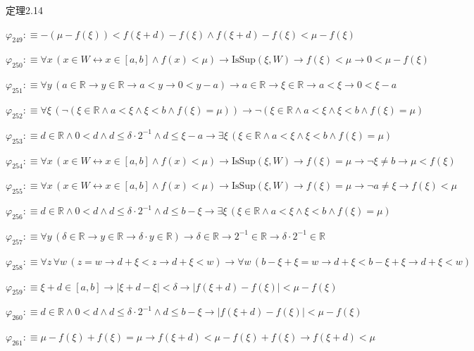 \begin{fullproof}{定理2.14}
\begin{abbrevlist}
\item $\varphi_{249} :\equiv -(\mu - f(\xi)) < f(\xi + d) - f(\xi) \land f(\xi + d) - f(\xi) < \mu - f(\xi)$
\item $\varphi_{250} :\equiv \forall x\,(x \in W \leftrightarrow x \in [a,b] \land f(x) < \mu) \to \mathrm{IsSup}(\xi,W) \to f(\xi) < \mu \to 0 < \mu - f(\xi)$
\item $\varphi_{251} :\equiv \forall y\,(a \in \mathbb{R} \to y \in \mathbb{R} \to a < y \to 0 < y - a) \to a \in \mathbb{R} \to \xi \in \mathbb{R} \to a < \xi \to 0 < \xi - a$
\item $\varphi_{252} :\equiv \forall \xi\,(\neg (\xi \in \mathbb{R} \land a < \xi \land \xi < b \land f(\xi) = \mu)) \to \neg (\xi \in \mathbb{R} \land a < \xi \land \xi < b \land f(\xi) = \mu)$
\item $\varphi_{253} :\equiv d \in \mathbb{R} \land 0 < d \land d \leq \delta \cdot 2^{-1} \land d \leq \xi - a \to \exists \xi\,(\xi \in \mathbb{R} \land a < \xi \land \xi < b \land f(\xi) = \mu)$
\item $\varphi_{254} :\equiv \forall x\,(x \in W \leftrightarrow x \in [a,b] \land f(x) < \mu) \to \mathrm{IsSup}(\xi,W) \to f(\xi) = \mu \to \neg \xi \neq b \to \mu < f(\xi)$
\item $\varphi_{255} :\equiv \forall x\,(x \in W \leftrightarrow x \in [a,b] \land f(x) < \mu) \to \mathrm{IsSup}(\xi,W) \to f(\xi) = \mu \to \neg a \neq \xi \to f(\xi) < \mu$
\item $\varphi_{256} :\equiv d \in \mathbb{R} \land 0 < d \land d \leq \delta \cdot 2^{-1} \land d \leq b - \xi \to \exists \xi\,(\xi \in \mathbb{R} \land a < \xi \land \xi < b \land f(\xi) = \mu)$
\item $\varphi_{257} :\equiv \forall y\,(\delta \in \mathbb{R} \to y \in \mathbb{R} \to \delta \cdot y \in \mathbb{R}) \to \delta \in \mathbb{R} \to 2^{-1} \in \mathbb{R} \to \delta \cdot 2^{-1} \in \mathbb{R}$
\item $\varphi_{258} :\equiv \forall z\,\forall w\,(z = w \to d + \xi < z \to d + \xi < w) \to \forall w\,(b - \xi + \xi = w \to d + \xi < b - \xi + \xi \to d + \xi < w)$
\item $\varphi_{259} :\equiv \xi + d \in [a,b] \to \lvert \xi + d - \xi \rvert < \delta \to \lvert f(\xi + d) - f(\xi) \rvert < \mu - f(\xi)$
\item $\varphi_{260} :\equiv d \in \mathbb{R} \land 0 < d \land d \leq \delta \cdot 2^{-1} \land d \leq b - \xi \to \lvert f(\xi + d) - f(\xi) \rvert < \mu - f(\xi)$
\item $\varphi_{261} :\equiv \mu - f(\xi) + f(\xi) = \mu \to f(\xi + d) < \mu - f(\xi) + f(\xi) \to f(\xi + d) < \mu$

\end{abbrevlist}
\end{fullproof}
